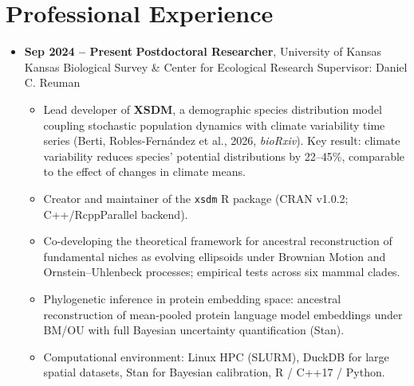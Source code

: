 \documentclass[11pt,a4paper]{article}
\begin{document}
\section*{Professional Experience}

\begin{itemize}[leftmargin=0pt]
\item \textbf{Sep 2024 -- Present} \quad \textbf{Postdoctoral Researcher}, University of Kansas\\
      Kansas Biological Survey \& Center for Ecological Research \textbar{} Supervisor: Daniel C. Reuman
  \begin{itemize}
    \item Lead developer of \textbf{XSDM}, a demographic species distribution model coupling stochastic population dynamics with climate variability time series (Berti, Robles-Fernández et al., 2026, \textit{bioRxiv}). Key result: climate variability reduces species' potential distributions by 22--45\%, comparable to the effect of changes in climate means.
    \item Creator and maintainer of the \texttt{xsdm} R package (CRAN v1.0.2; C++/RcppParallel backend).
    \item Co-developing the theoretical framework for ancestral reconstruction of fundamental niches as evolving ellipsoids under Brownian Motion and Ornstein--Uhlenbeck processes; empirical tests across six mammal clades.
    \item Phylogenetic inference in protein embedding space: ancestral reconstruction of mean-pooled protein language model embeddings under BM/OU with full Bayesian uncertainty quantification (Stan).
    \item Computational environment: Linux HPC (SLURM), DuckDB for large spatial datasets, Stan for Bayesian calibration, R / C++17 / Python.
  \end{itemize}


\end{itemize}
\end{document}

